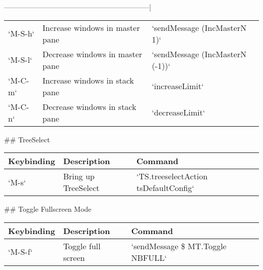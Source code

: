 \documentclass[11pt]{article}
\begin{document}
--------------------------------------------------------------|
\begin{center}
\begin{tabular}{lll}
`M-S-h` & Increase windows in master pane & `sendMessage (IncMasterN 1)`\\
`M-S-l` & Decrease windows in master pane & `sendMessage (IncMasterN (-1))`\\
`M-C-m` & Increase windows in stack pane & `increaseLimit`\\
`M-C-n` & Decrease windows in stack pane & `decreaseLimit`\\
\end{tabular}
\end{center}

\#\# TreeSelect

\begin{center}
\begin{tabular}{lll}
Keybinding & Description & Command\\
\hline
`M-s` & Bring up TreeSelect & `TS.treeselectAction tsDefaultConfig`\\
\end{tabular}
\end{center}

\#\# Toggle Fullscreen Mode

\begin{center}
\begin{tabular}{lll}
Keybinding & Description & Command\\
\hline
`M-S-f` & Toggle full screen & `sendMessage \$ MT.Toggle NBFULL`\\
\end{tabular}
\end{center}
\end{document}
